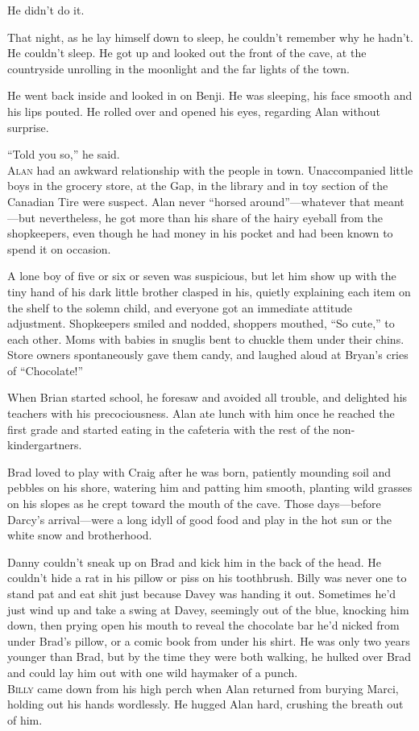 He didn't do it.

That night, as he lay himself down to sleep, he couldn't remember why
he hadn't.  He couldn't sleep.  He got up and looked out the front of
the cave, at the countryside unrolling in the moonlight and the far
lights of the town.

He went back inside and looked in on Benji.  He was sleeping, his face
smooth and his lips pouted.  He rolled over and opened his eyes,
regarding Alan without surprise.

``Told you so,'' he said.
\\
\lettrine[lines=3, lhang=.5, nindent=0pt, findent=2pt]{A}{lan} had an awkward relationship with the people in town. 
Unaccompanied little boys in the grocery store, at the Gap, in the
library and in toy section of the Canadian Tire were suspect.  Alan
never ``horsed around''---whatever that meant---but nevertheless, he
got more than his share of the hairy eyeball from the shopkeepers,
even though he had money in his pocket and had been known to spend it
on occasion.

A lone boy of five or six or seven was suspicious, but let him show up
with the tiny hand of his dark little brother clasped in his, quietly
explaining each item on the shelf to the solemn child, and everyone
got an immediate attitude adjustment.  Shopkeepers smiled and nodded,
shoppers mouthed, ``So cute,'' to each other.  Moms with babies in
snuglis bent to chuckle them under their chins.  Store owners
spontaneously gave them candy, and laughed aloud at Bryan's cries of
``Chocolate!''

When Brian started school, he foresaw and avoided all trouble, and
delighted his teachers with his precociousness.  Alan ate lunch with
him once he reached the first grade and started eating in the
cafeteria with the rest of the non-kindergartners.

Brad loved to play with Craig after he was born, patiently mounding
soil and pebbles on his shore, watering him and patting him smooth,
planting wild grasses on his slopes as he crept toward the mouth of
the cave.  Those days---before Darcy's arrival---were a long idyll of
good food and play in the hot sun or the white snow and brotherhood.

Danny couldn't sneak up on Brad and kick him in the back of the head. 
He couldn't hide a rat in his pillow or piss on his toothbrush.  Billy
was never one to stand pat and eat shit just because Davey was handing
it out.  Sometimes he'd just wind up and take a swing at Davey,
seemingly out of the blue, knocking him down, then prying open his
mouth to reveal the chocolate bar he'd nicked from under Brad's
pillow, or a comic book from under his shirt.  He was only two years
younger than Brad, but by the time they were both walking, he hulked
over Brad and could lay him out with one wild haymaker of a punch.
\\
\lettrine[lines=3, lhang=.5, nindent=0pt, findent=2pt]{B}{illy} came down from his high perch when Alan returned from burying
Marci, holding out his hands wordlessly.  He hugged Alan hard,
crushing the breath out of him.

